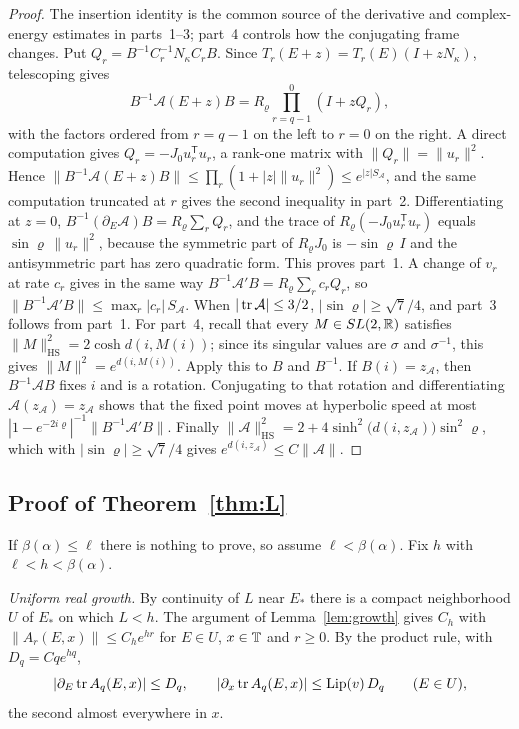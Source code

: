\begin{proof}
The insertion identity is the common source of the derivative and complex-energy estimates in parts~1--3; part~4 controls how the conjugating frame changes.
Put $Q_r=B^{-1}C_r^{-1}N_\kappa C_rB$. Since $T_r(E+z)=T_r(E)(I+zN_\kappa)$, telescoping gives
\[
B^{-1}\mathcal A(E+z)B=R_\varrho\prod_{r=q-1}^{0}(I+zQ_r),
\]
with the factors ordered from $r=q-1$ on the left to $r=0$ on the right. A direct computation gives $Q_r=-J_0u_r^{\mathsf T}u_r$, a rank-one matrix with $\|Q_r\|=\|u_r\|^2$. Hence $\|B^{-1}\mathcal A(E+z)B\|\le\prod_r(1+|z|\|u_r\|^2)\le e^{|z|S_{\mathcal A}}$, and the same computation truncated at $r$ gives the second inequality in part~2. Differentiating at $z=0$, $B^{-1}(\partial_E\mathcal A)B=R_\varrho\sum_rQ_r$, and the trace of $R_\varrho(-J_0u_r^{\mathsf T}u_r)$ equals $\sin\varrho\,\|u_r\|^2$, because the symmetric part of $R_\varrho J_0$ is $-\sin\varrho\,I$ and the antisymmetric part has zero quadratic form. This proves part~1. A change of $v_r$ at rate $c_r$ gives in the same way $B^{-1}\mathcal A'B=R_\varrho\sum_rc_rQ_r$, so $\|B^{-1}\mathcal A'B\|\le\max_r|c_r|\,S_{\mathcal A}$. When $|\operatorname{tr}\mathcal A|\le3/2$, $|\sin\varrho|\ge\sqrt7/4$, and part~3 follows from part~1. For part~4, recall that every $M\in SL(2,\mathbb R)$ satisfies $\|M\|_{\mathrm{HS}}^2=2\cosh d(i,M(i))$; since its singular values are $\sigma$ and $\sigma^{-1}$, this gives $\|M\|^2=e^{d(i,M(i))}$. Apply this to $B$ and $B^{-1}$. If $B(i)=z_{\mathcal A}$, then $B^{-1}\mathcal AB$ fixes $i$ and is a rotation. Conjugating to that rotation and differentiating $\mathcal A(z_{\mathcal A})=z_{\mathcal A}$ shows that the fixed point moves at hyperbolic speed at most $|1-e^{-2i\varrho}|^{-1}\|B^{-1}\mathcal A'B\|$. Finally $\|\mathcal A\|_{\mathrm{HS}}^2=2+4\sinh^2\bigl(d(i,z_{\mathcal A})\bigr)\sin^2\varrho$, which with $|\sin\varrho|\ge\sqrt7/4$ gives $e^{d(i,z_{\mathcal A})}\le C\|\mathcal A\|$.
\end{proof}

\subsection{Proof of Theorem~\ref{thm:L}}

If $\beta(\alpha)\le\ell$ there is nothing to prove, so assume $\ell<\beta(\alpha)$. Fix $h$ with $\ell<h<\beta(\alpha)$.

\emph{Uniform real growth.} By continuity of $L$ near $E_*$ there is a compact neighborhood $U$ of $E_*$ on which $L<h$. The argument of Lemma~\ref{lem:growth} gives $C_h$ with $\|A_r(E,x)\|\le C_he^{hr}$ for $E\in U$, $x\in\mathbb T$ and $r\ge0$. By the product rule, with $D_q=Cqe^{hq}$,
\begin{equation}\label{eq:Dq}
|\partial_E\operatorname{tr} A_q(E,x)|\le D_q,\qquad|\partial_x\operatorname{tr} A_q(E,x)|\le\mathrm{Lip}(v)\,D_q\qquad(E\in U),
\end{equation}
the second almost everywhere in $x$.

